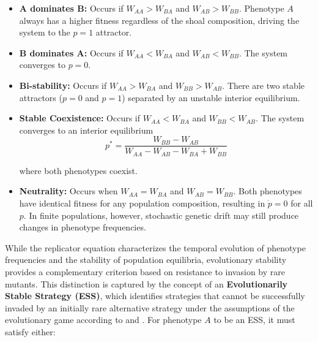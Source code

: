 \begin{itemize}
    \item \textbf{A dominates B:} Occurs if \(W_{AA} > W_{BA}\) and \(W_{AB} > W_{BB}\). Phenotype \(A\) always has a higher fitness regardless of the shoal composition, driving the system to the \(p=1\) attractor.\\
  
    \item \textbf{B dominates A:} Occurs if \(W_{AA} < W_{BA}\) and \(W_{AB} < W_{BB}\). The system converges to \(p=0\).\\

    \item \textbf{Bi-stability:} Occurs if \(W_{AA} > W_{BA}\) and \(W_{BB} > W_{AB}\). There are two stable attractors (\(p=0\) and \(p=1\)) separated by an unstable interior equilibrium.\\
    
    \item \textbf{Stable Coexistence:} Occurs if \(W_{AA} < W_{BA}\) and \(W_{BB} < W_{AB}\). The system converges to an interior equilibrium 
    \begin{equation}
        p^* = \frac{W_{BB}-W_{AB}}{W_{AA}-W_{AB}-W_{BA}+W_{BB}}
        \label{eq:pEquilibrium}
    \end{equation}

    where both phenotypes coexist.\\
    
    \item \textbf{Neutrality:} Occurs when \(W_{AA}=W_{BA}\) and \(W_{AB}=W_{BB}\). Both phenotypes have identical fitness for any population composition, resulting in \(\dot{p}=0\) for all \(p\). In finite populations, however, stochastic genetic drift may still produce changes in phenotype frequencies.
\end{itemize}

While the replicator equation characterizes the temporal evolution of phenotype frequencies and the stability of population equilibria, evolutionary stability provides a complementary criterion based on resistance to invasion by rare mutants. This distinction is captured by the concept of an  \textbf{Evolutionarily Stable Strategy (ESS)}, which identifies strategies that cannot be successfully invaded by an initially rare alternative strategy under the assumptions of the evolutionary game according to \cite{mit2021game} and \cite{nowakEvolutionaryDynamicsExploring2006}. For phenotype \(A\) to be an ESS, it must satisfy either:

